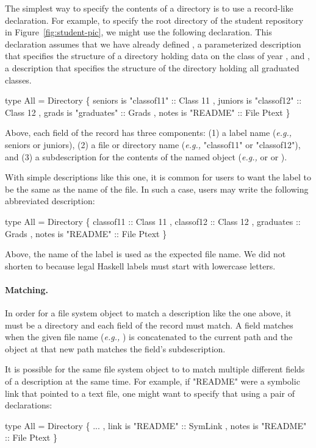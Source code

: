 \documentclass[natbib]{sigplanconf}
\begin{document}
The simplest way to specify the contents of a directory is to use
a record-like declaration.  For example, to specify the root directory
of the student repository in Figure~\ref{fig:student-pic}, we might use
the following declaration.  This declaration assumes that we have already
defined , a parameterized description that specifies
the structure of a directory holding data on the class of year ,
and , a description that specifies the structure of the directory holding
all graduated classes.   
\begin{code}
type All = Directory
  \{ seniors is "classof11" :: Class 11
  , juniors is "classof12" :: Class 12
  , grads is "graduates" :: Grads
  , notes is "README" :: File Ptext
  \}
\end{code}
Above, each field of the record has three components:  (1) a label
name ({\it e.g.,} seniors or juniors), (2) a file or directory name
({\it e.g.,} "classof11" or "classof12"), and (3) a \forest{} subdescription
for the contents of the named object ({\it e.g.,}  or 
or ).

With simple descriptions like this one, it is common for users to want
the label to be the same as the name of the file.  In such a case, users
may write the following abbreviated description:
\begin{code}
type All = Directory
  \{ classof11 :: Class 11
  , classof12 :: Class 12
  , graduates :: Grads
  , notes is "README" :: File Ptext
  \}
\end{code}
Above, the name of the label is used as the expected file name.  We did not
shorten  to  because legal Haskell labels must start
with lowercase letters.

\paragraph*{Matching.}
In order for a file system object to match a description like the one above, it must be a
directory and each field of the record must match.  A field matches when the given
file name ({\em e.g.,} ) is concatenated to the current path and the 
object at that new path matches the field's subdescription.

It is possible for the same file system object to to match multiple different fields of a description at
the same time.  For example, if "README" were a symbolic link that pointed to a text file, one 
might want to specify that using a pair of declarations:
\begin{code}
type All = Directory
  \{ ...
  , link is "README" :: SymLink
  , notes is "README" :: File Ptext
  \}
\end{code}
\end{document}
